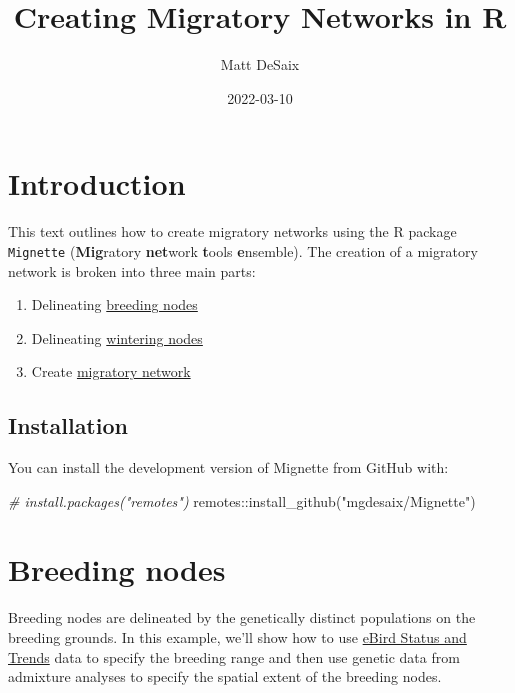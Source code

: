 \documentclass[
]{book}
\title{Creating Migratory Networks in R}
\author{Matt DeSaix}
\date{2022-03-10}
\newenvironment{Shaded}{\begin{snugshade}}{\end{snugshade}}
\newcommand{\CommentTok}[1]{\textcolor[rgb]{0.56,0.35,0.01}{\textit{#1}}}
\newcommand{\FunctionTok}[1]{\textcolor[rgb]{0.00,0.00,0.00}{#1}}
\newcommand{\NormalTok}[1]{#1}
\newcommand{\SpecialCharTok}[1]{\textcolor[rgb]{0.00,0.00,0.00}{#1}}
\newcommand{\StringTok}[1]{\textcolor[rgb]{0.31,0.60,0.02}{#1}}
\providecommand{\tightlist}{%
  \setlength{\itemsep}{0pt}\setlength{\parskip}{0pt}}
\begin{document}
\maketitle

{
\setcounter{tocdepth}{1}
\tableofcontents
}
\hypertarget{introduction}{%
\chapter{Introduction}\label{introduction}}

This text outlines how to create migratory networks using the R package \texttt{Mignette} (\textbf{Mig}ratory \textbf{net}work \textbf{t}ools \textbf{e}nsemble). The creation of a migratory network is broken into three main parts:

\begin{enumerate}
\def\labelenumi{\arabic{enumi}.}
\tightlist
\item
  Delineating \protect\hyperlink{breeding}{breeding nodes}
\item
  Delineating \protect\hyperlink{wintering}{wintering nodes}
\item
  Create \protect\hyperlink{connectivity}{migratory network}
\end{enumerate}

\hypertarget{installation}{%
\section{Installation}\label{installation}}

You can install the development version of Mignette from GitHub with:

\begin{Shaded}
\begin{Highlighting}[]
\CommentTok{\# install.packages("remotes")}
\NormalTok{remotes}\SpecialCharTok{::}\FunctionTok{install\_github}\NormalTok{(}\StringTok{"mgdesaix/Mignette"}\NormalTok{)}
\end{Highlighting}
\end{Shaded}

\hypertarget{breeding}{%
\chapter{Breeding nodes}\label{breeding}}

Breeding nodes are delineated by the genetically distinct populations on the breeding grounds. In this example, we'll show how to use \href{https://ebird.org/science/status-and-trends}{eBird Status and Trends} data to specify the breeding range and then use genetic data from admixture analyses to specify the spatial extent of the breeding nodes.
\end{document}
